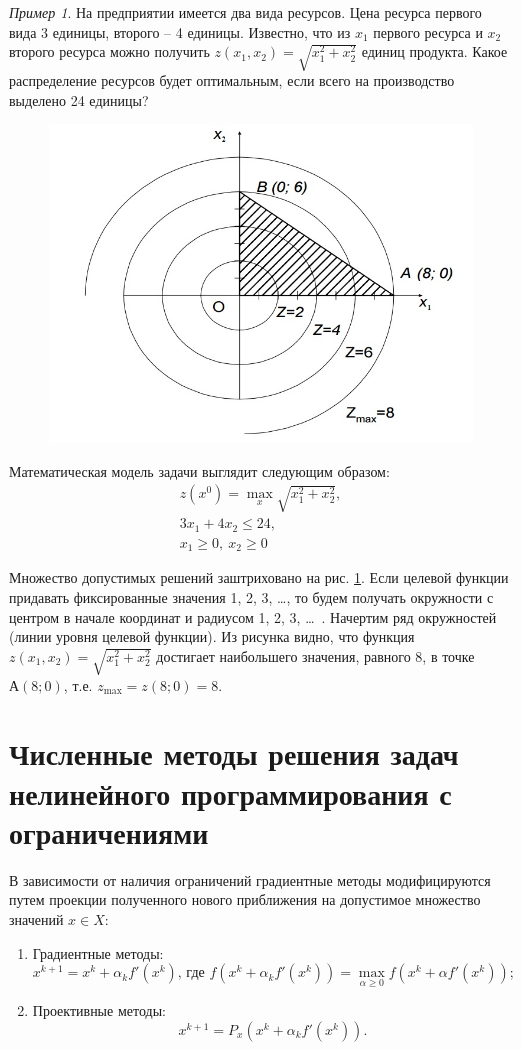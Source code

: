 \documentclass[12pt,a4paper,titlepage,oneside]{book}
\theoremstyle{definition}
\theoremstyle{plain}
\theoremstyle{remark}
\theoremstyle{remark}
\newtheorem{example}{Пример}
\theoremstyle{plain}
\theoremstyle{plain}
\begin{document}
\begin{example}
На предприятии имеется два вида ресурсов. Цена ресурса первого вида 3 единицы, второго -- 4 единицы. Известно, что из $x_1$ первого ресурса и  $x_2$ второго ресурса можно получить $z(x_1,x_2) = \sqrt{x_1^2 + x_2^2}$ единиц продукта. Какое распределение ресурсов будет оптимальным, если всего на производство выделено 24 единицы?

\begin{figure}[h]
	\centering
	\includegraphics[width=0.43\linewidth]{img41.jpg}
	\caption{} \label{img:img4.1}
\end{figure}

Математическая модель задачи выглядит следующим образом:
\begin{equation*}
\begin{aligned}
z(x^0) = \max_x \sqrt{x_1^2+x_2^2},\\
3x_1+4x_2 \leqslant 24, \\
x_1 \geqslant 0,~x_2 \geqslant 0
\end{aligned}
\end{equation*}
\end{example}

Множество допустимых решений заштриховано на рис. \ref{img:img4.1}. Если целевой функции придавать фиксированные значения 1, 2, 3, \dots, то будем получать окружности с центром в начале координат и радиусом 1, 2, 3, \dots~. Начертим ряд окружностей (линии уровня целевой функции). Из рисунка видно, что функция $z(x_1,x_2)=\sqrt{x_1^2+x_2^2}$ достигает наибольшего значения, равного 8, в точке $А(8; 0)$, т.е. $z_{\max}=z(8; 0)=8$.

\section{Численные методы решения задач нелинейного программирования с ограничениями}

В зависимости от наличия ограничений градиентные методы модифицируются путем проекции полученного нового приближения на допустимое множество значений $x \in X$:
\begin{enumerate}
\item Градиентные методы: 
$$ x^{k+1} = x^k +\alpha_k f'(x^k) \text{, где } f(x^k + \alpha_k f'(x^k)) = \max_{\alpha \geqslant 0} f(x^k + \alpha f'(x^k));$$
\item Проективные методы:
$$x^{k+1}=P_x(x^k + \alpha_k f'(x^k)).$$
\end{enumerate}
\end{document}
